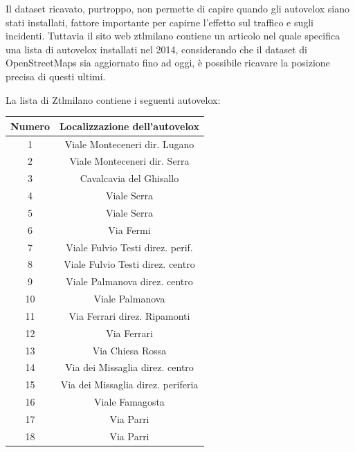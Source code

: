 \documentclass[a4paper]{report}
\begin{document}
Il dataset ricavato, purtroppo, non permette di capire quando gli autovelox siano stati 
installati, fattore importante per capirne l'effetto sul traffico e sugli incidenti.
Tuttavia il sito web ztlmilano \cite{ZTLMILANO:1}
contiene un articolo nel quale specifica una lista di 
autovelox installati nel 2014, considerando che il dataset di OpenStreetMaps sia aggiornato 
fino ad oggi, è possibile ricavare la posizione precisa di questi ultimi.

La lista di Ztlmilano contiene i seguenti autovelox: 

\begin{center}
    \def\arraystretch{1.5}%
    \begin{tabular}{ |c|c| } 
    \hline
    Numero & Localizzazione dell'autovelox \\ 
    \hline
    \rowcolor{TableGray}
    1   &   Viale Monteceneri  dir. Lugano\\
    2   &   Viale Monteceneri dir. Serra\\
    \rowcolor{TableGray}
    3   &   Cavalcavia del Ghisallo\\
    4   &   Viale Serra \\
    \rowcolor{TableGray}
    5   &   Viale Serra\\
    6   &   Via Fermi\\
    \rowcolor{TableGray}
    7   &   Viale Fulvio Testi direz. perif.\\
    8   &   Viale Fulvio Testi direz. centro\\
    \rowcolor{TableGray}
    9   &   Viale Palmanova  direz. centro\\
    10  &   Viale Palmanova\\
    \rowcolor{TableGray}
    11  &   Via Ferrari direz. Ripamonti\\
    12  &   Via Ferrari\\
    \rowcolor{TableGray}
    13  &   Via Chiesa Rossa\\
    14  &   Via dei Missaglia direz. centro\\
    \rowcolor{TableGray}
    15  &   Via dei Missaglia direz. periferia\\
    16  &   Viale Famagosta\\
    \rowcolor{TableGray}
    17  &   Via Parri\\
    18  &   Via Parri\\
    \hline
    \end{tabular}
    \label{ztl-milano}
\end{center}
\end{document}
